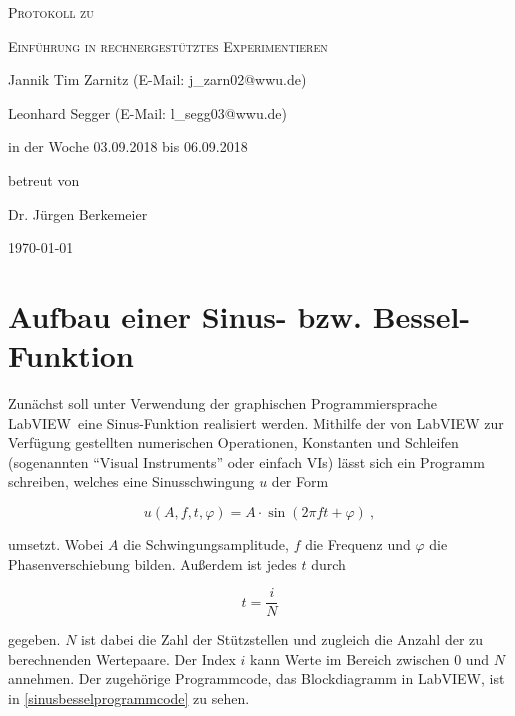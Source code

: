 \documentclass[
a4paper,
12pt,
pagesize,
ngerman
]{scrartcl}
\begin{document}
	
	\begin{titlepage}
		\centering
		{\scshape\LARGE Protokoll zu \par} %
		\vspace{1cm}
		{\scshape\huge Einführung in rechnergestütztes Experimentieren \par}
		\vspace{3cm}
		
		{\large Jannik Tim Zarnitz (E-Mail: j\_zarn02@wwu.de) \par}
		{\large Leonhard Segger (E-Mail: l\_segg03@wwu.de) \par}
		\vfill
		
		in der Woche 03.09.2018 bis 06.09.2018\par
		betreut von\par
		{\large Dr. Jürgen Berkemeier}
		
		\vfill
		
		{\large \today\par}
	\end{titlepage}
	\tableofcontents
	\newpage


	\section{Aufbau einer Sinus- bzw. Bessel-Funktion} \label{sinusfkt}
	
	Zunächst soll unter Verwendung der graphischen Programmiersprache \glqq LabVIEW\grqq\ eine Sinus-Funktion realisiert werden.
	Mithilfe der von LabVIEW zur Verfügung gestellten numerischen Operationen, Konstanten und Schleifen (sogenannten \enquote{Visual Instruments} oder einfach VIs) lässt sich ein Programm schreiben, welches eine Sinusschwingung $u$ der Form
	
	\begin{equation} \label{u}
	u(A,f,t,\varphi) = A \cdot \sin(2\pi f t + \varphi) \ ,
	\end{equation}
	
	\noindent umsetzt. Wobei $A$ die Schwingungsamplitude, $f$ die Frequenz und $\varphi$ die Phasenverschiebung bilden. Außerdem ist jedes $t$ durch 
	
	\begin{equation} \label{t}
	t = \frac{i}{N}
	\end{equation}
	
	\noindent gegeben. $N$ ist dabei die Zahl der Stützstellen und zugleich die Anzahl der zu berechnenden Wertepaare. Der Index $i$ kann Werte im Bereich zwischen $0$ und $N$ annehmen. Der zugehörige Programmcode, das Blockdiagramm in LabVIEW, ist in \cref{sinusbesselprogrammcode} zu sehen. 
	
\end{document}
